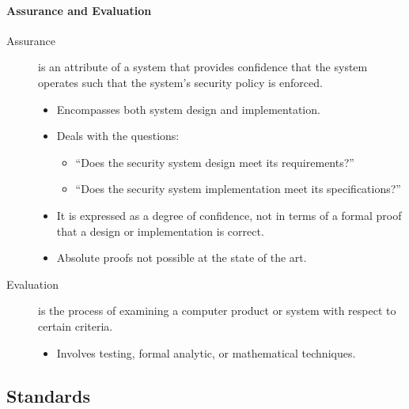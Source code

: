 \documentclass{article}
\begin{document}
                            \paragraph{Assurance and Evaluation}
                            
                            \begin{description}
                                \item[Assurance] is an attribute of a system that provides confidence that the system operates such that the system’s security policy is enforced.
                                \begin{itemize}
                                    \item Encompasses both system design and implementation.
                                    \item Deals with the questions:
                                    \begin{itemize}
                                        \item “Does the security system design meet its requirements?”
                                        \item “Does the security system implementation meet its specifications?”
                                    \end{itemize}
                                    \item It is expressed as a degree of confidence, not in terms of a formal proof that a design or implementation is correct.
                                    \item Absolute proofs not possible at the state of the art.
                                \end{itemize}
                                
                                \item[Evaluation] is the process of examining a computer product or system with respect to certain criteria.
                                \begin{itemize}
                                    \item Involves testing, formal analytic, or mathematical techniques.
                                \end{itemize}
                            \end{description}
                        \subsection{Standards}
\end{document}
